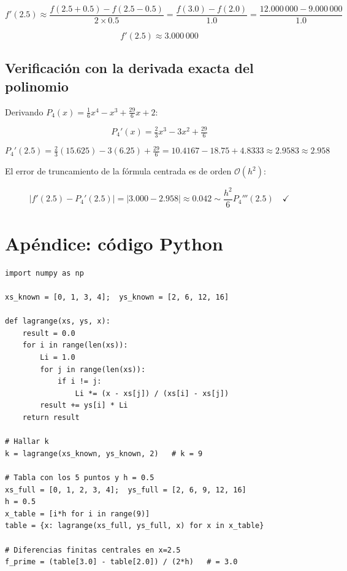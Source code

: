 \documentclass[12pt,a4paper]{article}
\begin{document}
\[
  f'(2.5) \approx \frac{f(2.5 + 0.5) - f(2.5 - 0.5)}{2 \times 0.5}
  = \frac{f(3.0) - f(2.0)}{1.0}
  = \frac{12.000\,000 - 9.000\,000}{1.0}
\]

\[
  \boxed{f'(2.5) \approx 3.000\,000}
\]

\subsection*{Verificaci\'on con la derivada exacta del polinomio}

Derivando $P_4(x) = \tfrac{1}{6}x^4 - x^3 + \tfrac{29}{6}x + 2$:

\[
  P_4'(x) = \tfrac{2}{3}x^3 - 3x^2 + \tfrac{29}{6}
\]

\[
  P_4'(2.5) = \tfrac{2}{3}(15.625) - 3(6.25) + \tfrac{29}{6}
            = 10.4167 - 18.75 + 4.8333
            \approx 2.9583 \approx 2.958
\]

El error de truncamiento de la f\'ormula centrada es de orden $\mathcal{O}(h^2)$:

\[
  |f'(2.5) - P_4'(2.5)| = |3.000 - 2.958| \approx 0.042
  \sim \frac{h^2}{6}P_4'''(2.5) \quad \checkmark
\]

\section*{Ap\'endice: c\'odigo Python}

\begin{lstlisting}[caption={Lagrange + diferencias finitas centrales}]
import numpy as np

xs_known = [0, 1, 3, 4];  ys_known = [2, 6, 12, 16]

def lagrange(xs, ys, x):
    result = 0.0
    for i in range(len(xs)):
        Li = 1.0
        for j in range(len(xs)):
            if i != j:
                Li *= (x - xs[j]) / (xs[i] - xs[j])
        result += ys[i] * Li
    return result

# Hallar k
k = lagrange(xs_known, ys_known, 2)   # k = 9

# Tabla con los 5 puntos y h = 0.5
xs_full = [0, 1, 2, 3, 4];  ys_full = [2, 6, 9, 12, 16]
h = 0.5
x_table = [i*h for i in range(9)]
table = {x: lagrange(xs_full, ys_full, x) for x in x_table}

# Diferencias finitas centrales en x=2.5
f_prime = (table[3.0] - table[2.0]) / (2*h)   # = 3.0
\end{lstlisting}
\end{document}
